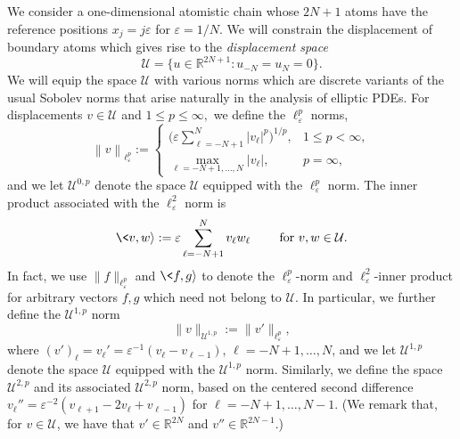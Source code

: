 \documentclass[12pt,reqno]{amsart}
\newcounter{remark}
\begin{document}
We consider a one-dimensional atomistic chain whose $2N+1$ atoms have
the reference positions $x_j = j {\varepsilon} $ for ${\varepsilon} = 1/N.$ We will
constrain the displacement of boundary atoms which gives rise to the
{\em displacement space}
\begin{displaymath}
  {\mathcal{U}} = \big\{ u \in {\mathbb{R}}^{2N+1} : u_{-N} = u_N = 0 \big\}.
\end{displaymath}
We will equip the space ${\mathcal{U}}$ with various norms which are discrete
variants of the usual Sobolev norms that arise naturally in the
analysis of elliptic PDEs. For displacements $v \in {\mathcal{U}}$ and $1 \leq p
\leq \infty,$ we define the $\ell^p_{\varepsilon}$ norms,
\begin{displaymath}
  {\left\|{v}\right\|_{\ell^{{p}}_{\varepsilon}}} := \begin{cases}
    \Big( {\varepsilon}\sum_{\ell=-N+1}^N |v_\ell|^p \Big)^{1/p},
    &1 \leq p < \infty, \\
    \max_{\ell = -N+1,\dots,N} |v_\ell|,
    &p = \infty,
  \end{cases}
\end{displaymath}
and we let ${\mathcal{U}}^{0,p}$ denote the space ${\mathcal{U}}$ equipped with the
$\ell^p_{\varepsilon}$ norm. The inner product associated with the
$\ell^2_{\varepsilon}$ norm is
\begin{equation*}
  \<v,w{\rangle} := {\varepsilon} \sum_{\ell=-N+1}^N v_\ell w_\ell \qquad
  \text{ for } v, w \in {\mathcal{U}}.
\end{equation*}
In fact, we use $\|f\|_{\ell^p_{\varepsilon}}$ and $\<f, g{\rangle}$ to denote the
$\ell^p_{\varepsilon}$-norm and $\ell^2_{\varepsilon}$-inner product for arbitrary
vectors $f, g$ which need not belong to ${\mathcal{U}}$. In particular, we
further define the ${\mathcal{U}}^{1,p}$ norm
\begin{equation}\label{equivdef}
  \|v\|_{{\mathcal{U}}^{1,p}} := \|v'\|_{\ell^p_{\varepsilon}},
\end{equation}
where $(v')_\ell = v_\ell'={\varepsilon}^{-1}(v_{\ell}-v_{\ell-1})$, $\ell =
-N+1, \dots, N$, and we let ${\mathcal{U}}^{1,p}$ denote the space ${\mathcal{U}}$
equipped with the ${\mathcal{U}}^{1,p}$ norm.  Similarly, we define the space
${\mathcal{U}}^{2,p}$ and its associated ${\mathcal{U}}^{2,p}$ norm, based on the centered
second difference $v_\ell'' = {\varepsilon}^{-2}(v_{\ell+1} - 2 v_\ell +
v_{\ell-1})$ for $\ell=-N+1,\dots,N-1.$ (We remark that, for $v \in
{\mathcal{U}}$, we have that $v' \in {\mathbb{R}}^{2N}$ and $v'' \in {\mathbb{R}}^{2N-1}$.)
\end{document}
